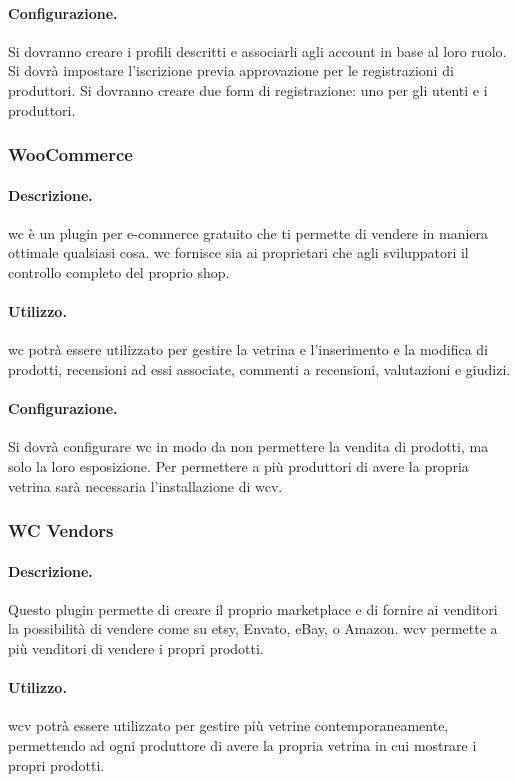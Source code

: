 \paragraph{Configurazione.}  Si dovranno creare i profili descritti e associarli agli account in base al loro ruolo. Si dovrà impostare l'iscrizione previa approvazione per le registrazioni di produttori. Si dovranno creare due form di registrazione: uno per gli utenti e i produttori.

\subsubsection{WooCommerce}
\paragraph{Descrizione.} \gls{wc} è un plugin per e-commerce gratuito che ti permette di vendere in maniera ottimale qualsiasi cosa. \gls{wc} fornisce sia ai proprietari che agli sviluppatori il controllo completo del proprio shop.
\paragraph{Utilizzo.} \gls{wc} potrà essere utilizzato per gestire la vetrina e l'inserimento e la modifica di prodotti, recensioni ad essi associate, commenti a recensioni, valutazioni e giudizi.
\paragraph{Configurazione.} Si dovrà configurare \gls{wc} in modo da non permettere la vendita di prodotti, ma solo la loro esposizione.
Per permettere a più produttori di avere la propria vetrina sarà necessaria l'installazione di \gls{wcv}.

\subsubsection{WC Vendors}
\paragraph{Descrizione.} Questo plugin permette di creare il proprio marketplace e di fornire ai venditori la possibilità di vendere come su etsy, Envato, eBay, o Amazon. \gls{wcv} permette a più venditori di vendere i propri prodotti.
\paragraph{Utilizzo.} \gls{wcv} potrà essere utilizzato per gestire più vetrine contemporaneamente, permettendo ad ogni produttore di avere la propria vetrina in cui mostrare i propri prodotti.
